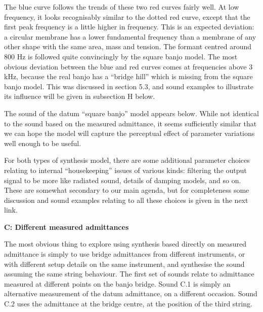 
  The blue curve follows the trends of these two red curves fairly well. At low 
  frequency, it looks recognisably similar to the dotted red curve, except that 
  the first peak frequency is a little higher in frequency. This is an expected 
  deviation: a circular membrane has a lower fundamental frequency than a 
  membrane of any other shape with the same area, mass and tension. The formant 
  centred around 800 Hz is followed quite convincingly by the square banjo 
  model. The most obvious deviation between the blue and red curves comes at 
  frequencies above 3 kHz, because the real banjo has a ``bridge hill'' which 
  is missing from the square banjo model. This was discussed in section 5.3, 
  and sound examples to illustrate its influence will be given in subsection H 
  below. 

  The sound of the datum ``square banjo'' model appears below. While not 
  identical to the sound based on the measured admittance, it seems 
  sufficiently similar that we can hope the model will capture the perceptual 
  effect of parameter variations well enough to be useful. 

\audio{}

  For both types of synthesis model, there are some additional parameter 
  choices relating to internal ``housekeeping'' issues of various kinds: 
  filtering the output signal to be more like radiated sound, details of 
  damping models, and so on. These are somewhat secondary to our main agenda, 
  but for completeness some discussion and sound examples relating to all these 
  choices is given in the next link. 

  \textbf{C: Different measured admittances} 

  The most obvious thing to explore using synthesis based directly on measured 
  admittance is simply to use bridge admittances from different instruments, or 
  with different setup details on the same instrument, and synthesise the sound 
  assuming the same string behaviour. The first set of sounds relate to 
  admittance measured at different points on the banjo bridge. Sound C.1 is 
  simply an alternative measurement of the datum admittance, on a different 
  occasion. Sound C.2 uses the admittance at the bridge centre, at the position 
  of the third string. 

